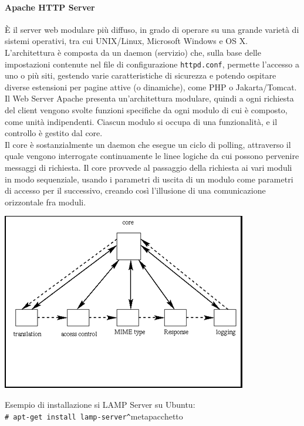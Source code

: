 \documentclass[a4paper]{report}
\newcommand\tab[1][1cm]{\hspace*{#1}}
\begin{document}
\paragraph{Apache HTTP Server} È il server web modulare più diffuso, in grado di operare su una grande varietà di sistemi operativi, tra cui UNIX/Linux, Microsoft Windows e OS X.\\
L'architettura è composta da un daemon (servizio) che, sulla base delle impostazioni contenute nel file di configurazione \texttt{httpd.conf}, permette l'accesso a uno o più siti, gestendo varie caratteristiche di sicurezza e potendo ospitare diverse estensioni per pagine attive (o dinamiche), come PHP o Jakarta/Tomcat.\\
Il Web Server Apache presenta un'architettura modulare, quindi a ogni richiesta del client vengono svolte funzioni specifiche da ogni modulo di cui è composto, come unità indipendenti. Ciascun modulo si occupa di una funzionalità, e il controllo è gestito dal core.\\
Il core è sostanzialmente un daemon che esegue un ciclo di polling, attraverso il quale vengono interrogate continuamente le linee logiche da cui possono pervenire messaggi di richiesta. Il core provvede al passaggio della richiesta ai vari moduli in modo sequenziale, usando i parametri di uscita di un modulo come parametri di accesso per il successivo, creando così l'illusione di una comunicazione orizzontale fra moduli.\\
\begin{center}
\includegraphics[scale=0.7]{core.png}
\end{center}
Esempio di installazione si LAMP Server su Ubuntu:\\
\tab\texttt{\# apt-get install lamp-server\^}\tab metapacchetto\\
\end{document}
